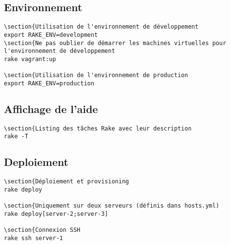 \documentclass[a4paper,oneside,11pt]{article}
\begin{document}
\subsection{Environnement}

\begin{verbatim}
\section{Utilisation de l'environnement de développement
export RAKE_ENV=development
\section{Ne pas oublier de démarrer les machines virtuelles pour l'environnement de développement
rake vagrant:up

\section{Utilisation de l'environnement de production
export RAKE_ENV=production
\end{verbatim}

\subsection{Affichage de l'aide}

\begin{verbatim}
\section{Listing des tâches Rake avec leur description
rake -T
\end{verbatim}

\subsection{Deploiement}

\begin{verbatim}
\section{Déploiement et provisioning
rake deploy

\section{Uniquement sur deux serveurs (définis dans hosts.yml)
rake deploy[server-2;server-3]

\section{Connexion SSH
rake ssh server-1
\end{verbatim}
\end{document}
